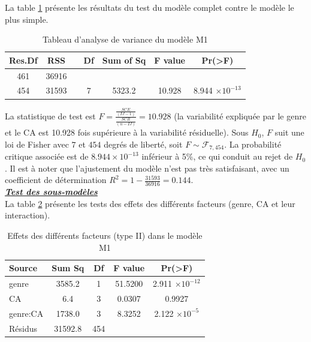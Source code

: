 \documentclass[12pt,a4paper]{article}
\begin{document}
\begin{enumerate}[label=\textbf{\alph*})]
	La table \ref{tab:anova_results1} présente les résultats du test du modèle complet contre le modèle le plus simple.
	\begin{table}[H]
		\centering
		\caption{Tableau d'analyse de variance du modèle M1}
		\begin{tabular}{ccccccc}
			\toprule
			\textbf{Res.Df} & \textbf{RSS} & & \textbf{Df} & \textbf{Sum of Sq} & \textbf{F value} & \textbf{Pr(>F)} \\ 
			\midrule
			461 & 36916 & & & & & \\ 
			454 & 31593 & & 7 & 5323.2 & 10.928 & 8.944 $\times 10^{-13}$ \\ 
			\bottomrule
		\end{tabular}
		\label{tab:anova_results1}
	\end{table}
	La statistique de test est $F = \frac{\frac{SCE}{(IJ - 1)}}{\frac{SCR}{(n - IJ)}} = 10.928$ (la variabilité expliquée par le genre et le CA est 10.928 fois supérieure à la variabilité résiduelle). Sous $H_0$, $F$ suit une loi de Fisher avec $7$ et $454$ degrés de liberté, soit $F \sim \mathcal{F}_{7,454}$. La probabilité critique associée est de $8.944 \times 10^{-13}$ inférieur à 5\%, ce qui conduit au rejet de $H_0$. Il est à noter que l'ajustement du modèle n'est pas très satisfaisant, avec un coefficient de détermination $R^2 = 1 - \frac{31593}{36916} = 0.144$.\\
	
	\textbf{\textit{\underline{Test des sous-modèles}}} \\
	
	La table \ref{tab:anova_results2} présente les tests des effets des différents facteurs (genre, CA et leur interaction).\\
	\begin{table}[H]
		\centering
		\caption{Effets des différents facteurs (type II) dans le modèle M1}
		\begin{tabular}{lcccc}
			\toprule
			Source & Sum Sq & Df & F value & Pr(>F) \\ 
			\midrule
			genre & 3585.2 & 1 & 51.5200 & 2.911 $\times 10^{-12}$ \\ 
			CA & 6.4 & 3 & 0.0307 & 0.9927 \\ 
			genre:CA & 1738.0 & 3 & 8.3252 & 2.122 $\times 10^{-5}$ \\ 
			Résidus & 31592.8 & 454 & & \\ 
			\bottomrule
		\end{tabular}
		\label{tab:anova_results2}
	\end{table}
	

\end{enumerate}
\end{document}
